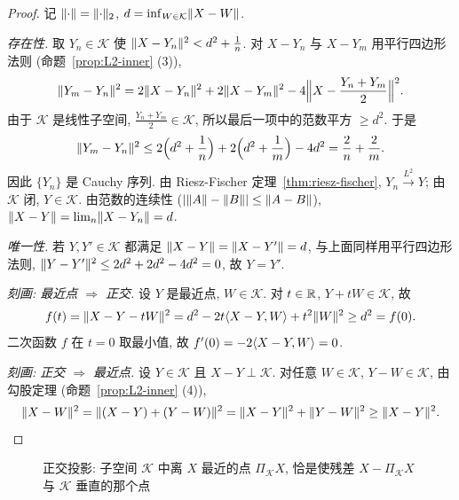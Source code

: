 \begin{proof}
记 $\lVert\cdot\rVert=\lVert\cdot\rVert_2$, $d=\inf_{W\in\mathcal{K}}\lVert X-W\rVert$.

\emph{存在性.} 取 $Y_n\in\mathcal{K}$ 使 $\lVert X-Y_n\rVert^2<d^2+\frac{1}{n}$. 对 $X-Y_n$ 与 $X-Y_m$ 用平行四边形法则 (命题~\ref{prop:L2-inner} (3)),
\[
\lVert Y_m-Y_n\rVert^2=2\lVert X-Y_n\rVert^2+2\lVert X-Y_m\rVert^2-4\Big\|X-\frac{Y_n+Y_m}{2}\Big\|^2.
\]
由于 $\mathcal{K}$ 是线性子空间, $\frac{Y_n+Y_m}{2}\in\mathcal{K}$, 所以最后一项中的范数平方 $\ge d^2$. 于是
\[
\lVert Y_m-Y_n\rVert^2\le2\Big(d^2+\frac{1}{n}\Big)+2\Big(d^2+\frac{1}{m}\Big)-4d^2=\frac{2}{n}+\frac{2}{m}.
\]
因此 $\{Y_n\}$ 是 Cauchy 序列. 由 Riesz-Fischer 定理~\ref{thm:riesz-fischer}, $Y_n\xrightarrow{L^2}Y$; 由 $\mathcal{K}$ 闭, $Y\in\mathcal{K}$. 由范数的连续性 ($\lvert\lVert A\rVert-\lVert B\rVert\rvert\le\lVert A-B\rVert$), $\lVert X-Y\rVert=\lim_n\lVert X-Y_n\rVert=d$.

\emph{唯一性.} 若 $Y,Y'\in\mathcal{K}$ 都满足 $\lVert X-Y\rVert=\lVert X-Y'\rVert=d$, 与上面同样用平行四边形法则, $\lVert Y-Y'\rVert^2\le2d^2+2d^2-4d^2=0$, 故 $Y=Y'$.

\emph{刻画: 最近点 $\Rightarrow$ 正交.} 设 $Y$ 是最近点, $W\in\mathcal{K}$. 对 $t\in\mathbb{R}$, $Y+tW\in\mathcal{K}$, 故
\[
f(t)=\lVert X-Y-tW\rVert^2=d^2-2t\langle X-Y,W\rangle+t^2\lVert W\rVert^2\ge d^2=f(0).
\]
二次函数 $f$ 在 $t=0$ 取最小值, 故 $f'(0)=-2\langle X-Y,W\rangle=0$.

\emph{刻画: 正交 $\Rightarrow$ 最近点.} 设 $Y\in\mathcal{K}$ 且 $X-Y\perp\mathcal{K}$. 对任意 $W\in\mathcal{K}$, $Y-W\in\mathcal{K}$, 由勾股定理 (命题~\ref{prop:L2-inner} (4)),
\[
\lVert X-W\rVert^2=\lVert(X-Y)+(Y-W)\rVert^2=\lVert X-Y\rVert^2+\lVert Y-W\rVert^2\ge\lVert X-Y\rVert^2.\qedhere
\]
\end{proof}

\begin{figure}[htbp]
\centering
{}
\caption{正交投影: 子空间 $\mathcal{K}$ 中离 $X$ 最近的点 $\Pi_{\mathcal{K}}X$, 恰是使残差 $X-\Pi_{\mathcal{K}}X$ 与 $\mathcal{K}$ 垂直的那个点}
\label{fig:projection}
\end{figure}

